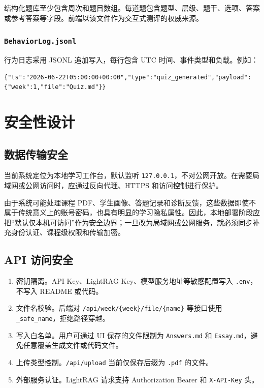 \documentclass[UTF8,fontset=windows,zihao=-4,openany]{ctexrep}
\begin{document}
结构化题库至少包含周次和题目数组。每道题包含题型、层级、题干、选项、答案或参考答案等字段。前端以该文件作为交互式测评的权威来源。

\subsection{\texttt{BehaviorLog.jsonl}}

行为日志采用 JSONL 追加写入，每行包含 UTC 时间、事件类型和负载。例如：
\begin{lstlisting}
{"ts":"2026-06-22T05:00:00+00:00","type":"quiz_generated","payload":{"week":1,"file":"Quiz.md"}}
\end{lstlisting}

\chapter{安全性设计}

\section{数据传输安全}

当前系统定位为本地学习工作台，默认监听 \texttt{127.0.0.1}，不对公网开放。在需要局域网或公网访问时，应通过反向代理、HTTPS 和访问控制进行保护。

由于系统可能处理课程 PDF、学生画像、答题记录和诊断反馈，这些数据即使不属于传统意义上的账号密码，也具有明显的学习隐私属性。因此，本地部署阶段应把“默认仅本机可访问”作为安全边界；一旦改为局域网或公网服务，就必须同步补充身份认证、课程级权限和传输加密。

\section{API 访问安全}

\begin{enumerate}
  \item 密钥隔离。API Key、LightRAG Key、模型服务地址等敏感配置写入 \texttt{.env}，不写入 README 或代码。
  \item 文件名校验。后端对 \texttt{/api/week/\{week\}/file/\{name\}} 等接口使用 \texttt{\_safe\_name}，拒绝路径穿越。
  \item 写入白名单。用户可通过 UI 保存的文件限制为 \texttt{Answers.md} 和 \texttt{Essay.md}，避免任意覆盖生成文件或代码文件。
  \item 上传类型控制。\texttt{/api/upload} 当前仅保存后缀为 \texttt{.pdf} 的文件。
  \item 外部服务认证。LightRAG 请求支持 Authorization Bearer 和 \texttt{X-API-Key} 头。
\end{enumerate}
\end{document}
